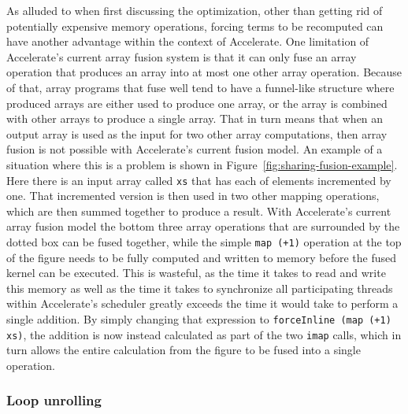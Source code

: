 \documentclass[fontsize=11pt,a4paper,parskip=half,numbers=noenddot]{scrartcl}
\newcommand{\hask}[1]{\texttt{#1}}
\begin{document}
As alluded to when first discussing the optimization, other than getting rid of
potentially expensive memory operations, forcing terms to be recomputed can have
another advantage within the context of Accelerate. One limitation of
Accelerate's current array fusion system is that it can only fuse an array
operation that produces an array into at most one other array operation. Because
of that, array programs that fuse well tend to have a funnel-like structure
where produced arrays are either used to produce one array, or the array is
combined with other arrays to produce a single array. That in turn means that
when an output array is used as the input for two other array computations, then
array fusion is not possible with Accelerate's current fusion model. An example
of a situation where this is a problem is shown in
Figure~\ref{fig:sharing-fusion-example}. Here there is an input array called
\hask{xs} that has each of elements incremented by one. That incremented version
is then used in two other mapping operations, which are then summed together to
produce a result. With Accelerate's current array fusion model the bottom three
array operations that are surrounded by the dotted box can be fused together,
while the simple \hask{map (+1)} operation at the top of the figure needs to be
fully computed and written to memory before the fused kernel can be executed.
This is wasteful, as the time it takes to read and write this memory as well as
the time it takes to synchronize all participating threads within Accelerate's
scheduler greatly exceeds the time it would take to perform a single addition.
By simply changing that expression to \hask{forceInline (map (+1) xs)}, the
addition is now instead calculated as part of the two \hask{imap} calls, which
in turn allows the entire calculation from the figure to be fused into a single
operation.

\subsubsection{Loop unrolling}
\end{document}
